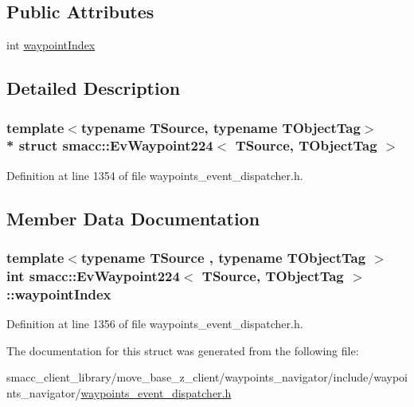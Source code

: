 \subsection*{Public Attributes}
\begin{DoxyCompactItemize}
\item 
int \hyperlink{structsmacc_1_1EvWaypoint224_ae2588b6ba517692e87664481ab89d3d1}{waypoint\+Index}
\end{DoxyCompactItemize}


\subsection{Detailed Description}
\subsubsection*{template$<$typename T\+Source, typename T\+Object\+Tag$>$\\*
struct smacc\+::\+Ev\+Waypoint224$<$ T\+Source, T\+Object\+Tag $>$}



Definition at line 1354 of file waypoints\+\_\+event\+\_\+dispatcher.\+h.



\subsection{Member Data Documentation}
\subsubsection[{\texorpdfstring{waypoint\+Index}{waypointIndex}}]{\setlength{\rightskip}{0pt plus 5cm}template$<$typename T\+Source , typename T\+Object\+Tag $>$ int {\bf smacc\+::\+Ev\+Waypoint224}$<$ T\+Source, T\+Object\+Tag $>$\+::waypoint\+Index}\hypertarget{structsmacc_1_1EvWaypoint224_ae2588b6ba517692e87664481ab89d3d1}{}\label{structsmacc_1_1EvWaypoint224_ae2588b6ba517692e87664481ab89d3d1}


Definition at line 1356 of file waypoints\+\_\+event\+\_\+dispatcher.\+h.



The documentation for this struct was generated from the following file\+:\begin{DoxyCompactItemize}
\item 
smacc\+\_\+client\+\_\+library/move\+\_\+base\+\_\+z\+\_\+client/waypoints\+\_\+navigator/include/waypoints\+\_\+navigator/\hyperlink{waypoints__event__dispatcher_8h}{waypoints\+\_\+event\+\_\+dispatcher.\+h}\end{DoxyCompactItemize}
